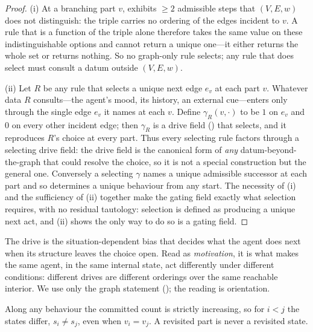 \documentclass[11pt,twocolumn,a4paper]{article}
\newcommand{\V}{V}
\newcommand{\E}{E}
\newcommand{\wt}{w}
\newcommand{\drive}{\gamma}          %
\newcommand{\state}{s}
\begin{document}
\begin{proof}
(i) At a branching part $v$,  exhibits $\ge2$ admissible
steps that $(\V,\E,\wt)$ does not distinguish: the triple carries no
ordering of the edges incident to $v$. A rule that is a function of the
triple alone therefore takes the same value on these indistinguishable
options and cannot return a unique one---it either returns the whole set or
returns nothing. So no graph-only rule selects; any rule that does select
must consult a datum outside $(\V,\E,\wt)$.

(ii) Let $R$ be any rule that selects a unique next edge $e_v$ at each part
$v$. Whatever data $R$ consults---the agent's mood, its history, an
external cue---enters only through the single edge $e_v$ it names at each
$v$. Define $\drive_R(v,\cdot)$ to be $1$ on $e_v$ and $0$ on every other
incident edge; then $\drive_R$ is a drive field () that
selects, and it reproduces $R$'s choice at every part. Thus every selecting
rule factors through a selecting drive field: the drive field is the
canonical form of \emph{any} datum-beyond-the-graph that could resolve the
choice, so it is not a special construction but the general one. Conversely
a selecting $\drive$ names a unique admissible successor at each part and so
determines a unique behaviour from any start. The necessity of (i) and the
sufficiency of (ii) together make the gating field exactly what selection
requires, with no residual tautology: selection is defined as producing a
unique next act, and (ii) shows the only way to do so is a gating field.
\end{proof}

\begin{remark}
\label{rem:motivation}
The drive is the situation-dependent bias that decides what the agent
does next when its structure leaves the choice open. Read as
\emph{motivation}, it is what makes the same agent, in the same internal
state, act differently under different conditions: different drives are
different orderings over the same reachable interior. We use only the
graph statement (); the reading is orientation.
\end{remark}

\begin{proposition}
\label{prop:nonreturn}
Along any behaviour the committed count is strictly increasing, so for
$i<j$ the states differ, $\state_i\neq\state_j$, even when $v_i=v_j$. A
revisited part is never a revisited state.
\end{proposition}
\end{document}
